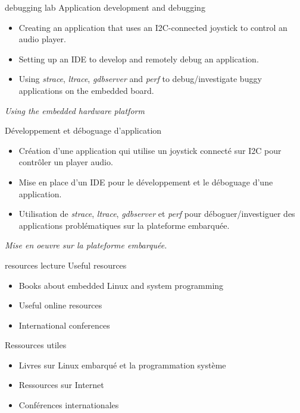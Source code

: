 {debugging}
{lab}
{Application development and debugging}
{
  \begin{itemize}
  \item Creating an application that uses an I2C-connected joystick to
    control an audio player.
  \item Setting up an IDE to develop and remotely debug an
    application.
  \item Using {\em strace}, {\em ltrace}, {\em gdbserver} and {\em
      perf} to debug/investigate buggy applications on the embedded
    board.
  \end{itemize}

  \vspace{0.5cm}
  {\em Using the embedded hardware platform}
}
{Développement et déboguage d'application}
{
  \begin{itemize}
  \item Création d'une application qui utilise un joystick connecté
    sur I2C pour contrôler un player audio.
  \item Mise en place d'un IDE pour le développement et le déboguage
    d'une application.
  \item Utilisation de {\em strace}, {\em ltrace}, {\em gdbserver} et
    {\em perf} pour déboguer/investiguer des applications
    problématiques sur la plateforme embarquée.
  \end{itemize}
  {\em Mise en oeuvre sur la plateforme embarquée.}
}
{resources}
{lecture}
{Useful resources}
{
  \begin{itemize}
  \item Books about embedded Linux and system programming
  \item Useful online resources
  \item International conferences
  \end{itemize}
}
{Ressources utiles}
{
  \begin{itemize}
  \item Livres sur Linux embarqué et la programmation système
  \item Ressources sur Internet
  \item Conférences internationales
  \end{itemize}
}

\def \feshowboards{
    \ifthenelse{\equal{\agendalanguage}{french}}{
      \section{Plateforme matérielle pour les travaux pratiques}
    }{
      \section{Hardware platform for practical labs}
    }

  \showboarditem{stm32mp1}
  \showboarditem{beagleboneblack}
  \showboarditem{beagleplay}
  \newpage
}


